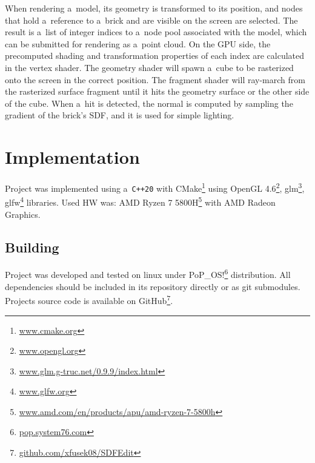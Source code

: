 \documentclass[11pt, a4paper]{article}
\begin{document}
When rendering a~model, its geometry is transformed to its position, and nodes that hold a~reference to a~brick and are visible on the screen are selected. The result is a~list of integer indices to a~node pool associated with the model, which can be submitted for rendering as a~point cloud.
On the GPU side, the precomputed shading and transformation properties of each index are calculated in the vertex shader.
The geometry shader will spawn a~cube to be rasterized onto the screen in the correct position.
The fragment shader will ray-march from the rasterized surface fragment until it hits the geometry surface or the other side of the cube.
When a~hit is detected, the normal is computed by sampling the gradient of the brick's SDF, and it is used for simple lighting.


\section{Implementation}

Project was implemented using a~\texttt{C++20} with CMake\footnote{\href{https://cmake.org/}{www.cmake.org}} using OpenGL 4.6\footnote{\href{https://www.opengl.org/}{www.opengl.org}}, glm\footnote{\href{https://glm.g-truc.net/0.9.9/index.html}{www.glm.g-truc.net/0.9.9/index.html}}, glfw\footnote{\href{https://www.glfw.org/}{www.glfw.org}} libraries.
Used HW was: AMD Ryzen{\scriptsize\texttrademark} 7 5800H\footnote{\href{https://www.amd.com/en/products/apu/amd-ryzen-7-5800h}{www.amd.com/en/products/apu/amd-ryzen-7-5800h}}
with AMD Radeon{\scriptsize\texttrademark} Graphics.
\subsection{Building}
Project was developed and tested on linux under PoP\_OS!\footnote{\href{https://pop.system76.com/}{pop.system76.com}} distribution.
All dependencies should be included in its repository directly or as git submodules.
Projects source code is available on GitHub\footnote{\href{https://github.com/xfusek08/SDFEdit}{github.com/xfusek08/SDFEdit}}.
\end{document}
